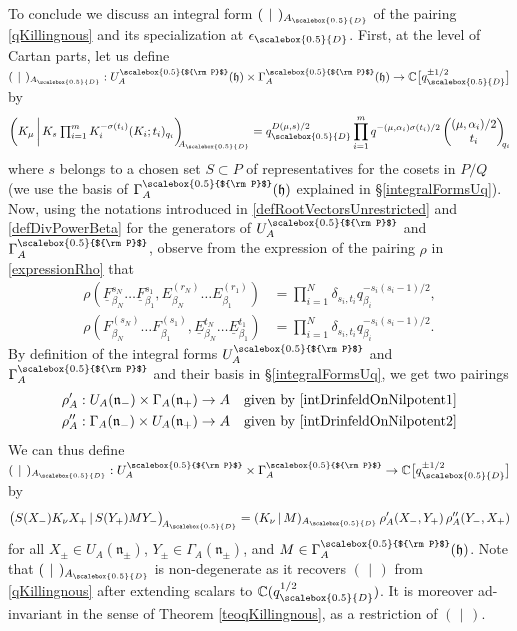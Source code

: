\documentclass[11pt]{amsart}
\newcommand{\qD}{q_{\scalebox{0.5}{D}}}
\newcommand{\eD}{\epsilon_{\scalebox{0.5}{D}}}
\newcommand{\AD}{A_{\scalebox{0.5}{D}}}
\newcommand{\Pup}{{\scalebox{0.5}{${\rm P}$}}}
\begin{document}
To conclude we discuss an integral form $(\:\,|\,\:)_{\AD}$ of the pairing \eqref{qKillingnous} and its specialization at $\eD$. First, at the level of Cartan parts, let us define $(\:\,|\,\:)_{\AD} : U_A^\Pup(\mathfrak{h}) \times \Gamma_A^\Pup(\mathfrak{h}) \to \mathbb{C}\bigl[ \qD^{\pm 1/2} \bigr]$ by
\begin{equation}\label{IntKillingCartan}
\biggl( K_\mu \,\bigg| \, K_s \:{\textstyle \prod}_{i=1}^m \, K_i^{-\sigma(t_i)}(K_i; t_i)_{q_i} \biggr)_{\!\!\!\AD} = \qD^{D(\mu,s)/2} \prod_{i=1}^m q^{-(\mu,\alpha_i)\sigma(t_i)/2}\begin{pmatrix} (\mu,\alpha_i)/2 \\ t_i \end{pmatrix}_{\!\!q_i}
\end{equation}
where $s$ belongs to a chosen set $S \subset P$ of representatives for the cosets in $P/Q$ (we use the basis of $\Gamma_A^\Pup(\mathfrak{h})$ explained in \S\ref{integralFormsUq}). Now, using the notations introduced in \eqref{defRootVectorsUnrestricted} and \eqref{defDivPowerBeta} for the generators of $U_A^\Pup$ and $\Gamma_A^\Pup$, observe from the expression of the pairing $\rho$ in \eqref{expressionRho} that
\begin{align}
\rho\!\left(\underline{F}_{\beta_N}^{s_N}\ldots \underline{F}_{\beta_1}^{s_1}, E_{\beta_N}^{(r_N)}\ldots E_{\beta_1}^{(r_1)}\right) &= \textstyle \prod_{i=1}^N \delta_{s_i,t_i} q_{\beta_i}^{-s_i(s_i-1)/2},\label{intDrinfeldOnNilpotent1}\\
\rho\!\left(F_{\beta_N}^{(s_N)}\ldots F_{\beta_1}^{(s_1)}, \underline{E}_{\beta_N}^{t_N}\ldots \underline{E}_{\beta_1}^{t_1}\right) & = \textstyle \prod_{i=1}^N \delta_{s_i,t_i} q_{\beta_i}^{-s_i(s_i-1)/2}.\label{intDrinfeldOnNilpotent2}
\end{align}
By definition of the integral forms $U_A^\Pup$ and $\Gamma_A^\Pup$ and their basis in \S\ref{integralFormsUq}, we get two pairings
\begin{align*}
&\rho'_A : U_A(\mathfrak{n}_-) \times \Gamma_A(\mathfrak{n}_+) \to A \quad \text{given by \eqref{intDrinfeldOnNilpotent1}}\\
&\rho''_A : \Gamma_A(\mathfrak{n}_-) \times U_A(\mathfrak{n}_+) \to A \quad \text{given by \eqref{intDrinfeldOnNilpotent2}}
\end{align*}
We can thus define $(\:\,|\,\:)_{\AD} : U_A^\Pup \times \Gamma_A^\Pup \to \mathbb{C}\bigl[ \qD^{\pm 1/2} \bigr]$ by
\begin{equation}\label{integralKillingForm}
\bigl( S(X_-) K_\nu X_+ \,|\, S(Y_+) M Y_- \bigr)_{\!\AD} = (K_\nu \,|\, M)_{\AD}\, \rho'_A(X_-, Y_+) \, \rho''_A(Y_-,X_+)
\end{equation}
for all $X_\pm \in U_A(\mathfrak{n}_\pm)$, $Y_\pm \in \Gamma_A(\mathfrak{n}_\pm)$, and $M\in \Gamma_A^\Pup(\mathfrak{h})$. Note that $(\:\,|\,\:)_{\AD}$ is non-degenerate as it recovers $(\:\,|\, \:)$ from \eqref{qKillingnous} after extending scalars to $\mathbb{C}(\qD^{1/2})$. It is moreover ad-invariant in the sense of Theorem \ref{teoqKillingnous}, as a restriction of $(\:\,|\,\:)$.
\end{document}
